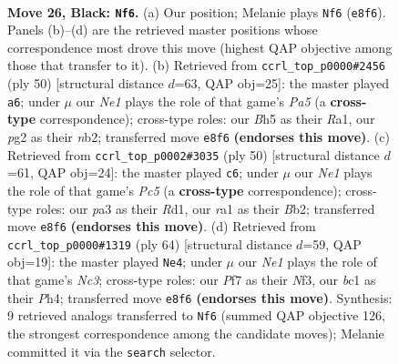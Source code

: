 \documentclass[11pt]{article}
\begin{document}
\clearpage

\begin{figure}[p]\centering
\begin{subfigure}{0.46\textwidth}\centering
\resizebox{\linewidth}{!}{%
\newchessgame
\chessboard[
  setfen={1r2n1k1/2p2ppp/p7/2P1pn1b/B7/P7/6P1/RNB3K1 b - - 0 26},
  showmover=false,
  pgfstyle=straightmove, color=movearrow, markmove={e8-f6}
]}
\caption{}
\end{subfigure}\hfill
\begin{subfigure}{0.46\textwidth}\centering
\resizebox{\linewidth}{!}{%
\newchessgame
\chessboard[
  setfen={7r/ppk2p1p/2p5/P4N2/1b2BP2/4P3/1n2KP1P/R7 w - - 3 26},
  showmover=false,
  pgfstyle=straightmove, color=movearrow, markmove={a5-a6}
]}
\caption{}
\end{subfigure}
\\[4pt]
\begin{subfigure}{0.46\textwidth}\centering
\resizebox{\linewidth}{!}{%
\newchessgame
\chessboard[
  setfen={4r1k1/5p1p/p5pb/2P1P3/Pp6/1n3N2/1B3PPP/3R2K1 w - - 0 26},
  showmover=false,
  pgfstyle=straightmove, color=movearrow, markmove={c5-c6}
]}
\caption{}
\end{subfigure}\hfill
\begin{subfigure}{0.46\textwidth}\centering
\resizebox{\linewidth}{!}{%
\newchessgame
\chessboard[
  setfen={1r2n1k1/6p1/p3p2p/b3P3/2R4P/2N2NP1/P5K1/8 w - - 3 33},
  showmover=false,
  pgfstyle=straightmove, color=movearrow, markmove={c3-e4}
]}
\caption{}
\end{subfigure}
\caption{\textbf{Move 26, Black: \texttt{Nf6}.} (a) Our position; Melanie plays \texttt{Nf6} (\texttt{e8f6}). Panels (b)--(d) are the retrieved master positions whose correspondence most drove this move (highest QAP objective among those that transfer to it). (b) Retrieved from \texttt{ccrl\_top\_p0000\#2456} (ply 50) [structural distance $d$=63, QAP obj=25]: the master played \texttt{a6}; under $\mu$ our \emph{Ne1} plays the role of that game's \emph{Pa5} (a \textbf{cross-type} correspondence); cross-type roles: our \emph{B}h5 as their \emph{R}a1, our \emph{p}g2 as their \emph{n}b2; transferred move \texttt{e8f6} \textbf{(endorses this move)}. (c) Retrieved from \texttt{ccrl\_top\_p0002\#3035} (ply 50) [structural distance $d$=61, QAP obj=24]: the master played \texttt{c6}; under $\mu$ our \emph{Ne1} plays the role of that game's \emph{Pc5} (a \textbf{cross-type} correspondence); cross-type roles: our \emph{p}a3 as their \emph{R}d1, our \emph{r}a1 as their \emph{B}b2; transferred move \texttt{e8f6} \textbf{(endorses this move)}. (d) Retrieved from \texttt{ccrl\_top\_p0000\#1319} (ply 64) [structural distance $d$=59, QAP obj=19]: the master played \texttt{Ne4}; under $\mu$ our \emph{Ne1} plays the role of that game's \emph{Nc3}; cross-type roles: our \emph{P}f7 as their \emph{N}f3, our \emph{b}c1 as their \emph{P}h4; transferred move \texttt{e8f6} \textbf{(endorses this move)}. Synthesis: 9 retrieved analogs transferred to \texttt{Nf6} (summed QAP objective 126, the strongest correspondence among the candidate moves); Melanie committed it via the \texttt{search} selector.}
\label{fig:thought-m51}
\end{figure}
\end{document}
